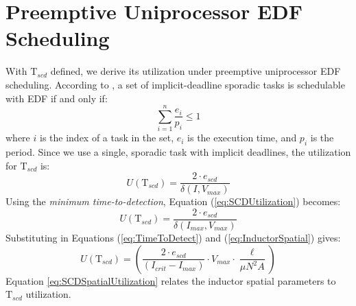 \documentclass[11pt,oneside]{report}
\begin{document}
    \section{Preemptive Uniprocessor EDF Scheduling}
    With $\mathrm{T}_{scd}$ defined, we derive its utilization under preemptive uniprocessor EDF scheduling. According to \cite{LiuLayland}, a set of implicit-deadline sporadic tasks is schedulable with EDF if and only if:
    \begin{equation}\label{eq:EDFUtilization}
    \sum_{i=1}^{n} \frac{e_{i}}{p_{i}} \leq 1
    \end{equation}
    where $i$ is the index of a task in the set, $e_{i}$ is the execution time, and $p_{i}$ is the period. Since we use a single, sporadic task with implicit deadlines, the utilization for $\mathrm{T}_{scd}$ is:
    \begin{equation}\label{eq:SCDUtilization}
    U(\mathrm{T}_{scd}) = \frac{2 \cdot e_{scd}}{\delta(I,V_{max})}
    \end{equation}
    Using the \textit{minimum time-to-detection}, Equation (\ref{eq:SCDUtilization}) becomes:
    \begin{equation}\label{eq:SCDMinUtilization}
    U(\mathrm{T}_{scd}) = \frac{2 \cdot e_{scd}}{\delta(I_{max},V_{max})}
    \end{equation}
    Substituting in Equations (\ref{eq:TimeToDetect}) and (\ref{eq:InductorSpatial}) gives:
    \begin{equation}\label{eq:SCDSpatialUtilization}
    U(\mathrm{T}_{scd}) = (\frac{2 \cdot e_{scd}}{(I_{crit}-I_{max})} \cdot V_{max} \cdot \frac{\ell}{\mu N^{2}A})
    \end{equation}
    Equation \ref{eq:SCDSpatialUtilization} relates the inductor spatial parameters to $\mathrm{T}_{scd}$ utilization.
    
    
\end{document}
